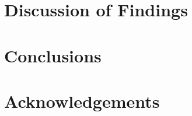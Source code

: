 \documentclass[letterpaper]{article} %
\begin{document}
\section{Discussion of Findings} \label{section:discussion_of_findings}


\section{Conclusions} \label{section5:conclusion}


\section*{Acknowledgements} \label{section:acknowledgements}




\clearpage
\appendix

\end{document}
